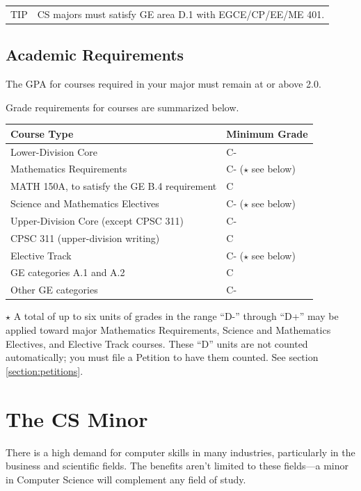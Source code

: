 \documentclass{book}
\newenvironment{tip}
               {\tcolorbox \begin{tabular}{m{.5in} m{5in}} \Large{TIP} & }
               {\end{tabular} \endtcolorbox}
\begin{document}
\begin{tip}
CS majors must satisfy GE area D.1 with EGCE/CP/EE/ME 401.
\end{tip}

\section{Academic Requirements}

The GPA for courses required in your major must remain at or above 2.0.

Grade requirements for courses are summarized below.

\begin{center}
\begin{tabular}{|l|l|} \hline
  \textbf{Course Type} & \textbf{Minimum Grade} \\ \hline
  Lower-Division Core & C- \\ \hline
  Mathematics Requirements & C- ($\star$ see below) \\ \hline
  MATH 150A, to satisfy the GE B.4 requirement & C \\ \hline
  Science and Mathematics Electives & C- ($\star$ see below) \\ \hline
  Upper-Division Core (except CPSC 311) & C- \\ \hline
  CPSC 311 (upper-division writing) & C \\ \hline
  Elective Track & C- ($\star$ see below) \\ \hline
  GE categories A.1 and A.2 & C \\ \hline
  Other GE categories & C- \\ \hline
\end{tabular}
\end{center}

$\star$ A total of up to six units of grades in the range ``D-'' through ``D+'' may be applied toward major Mathematics Requirements, Science and Mathematics Electives, and Elective Track courses. These ``D'' units are not counted automatically; you must file a Petition to have them counted. See section \ref{section:petitions}.

\chapter{The CS Minor}

There is a high demand for computer skills in many industries, particularly in the business and scientific fields. The benefits aren't limited to these fields---a minor in Computer Science will complement any field of study.
\end{document}
